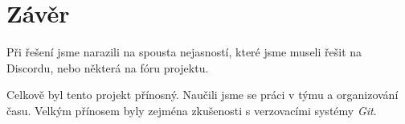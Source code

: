 
\section{Závěr}
Při řešení jsme narazili na spousta nejasností, které jsme museli řešit na Discordu, nebo některá na fóru projektu.

Celkově byl tento projekt přínosný. Naučili jsme se práci v týmu a organizování času.
Velkým přínosem byly zejména zkušenosti s verzovacími systémy \textit{Git}.

\newpage